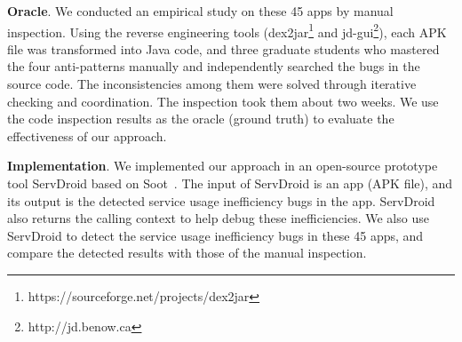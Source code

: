 \documentclass[sigconf,review, anonymous]{acmart}
\begin{document}
\textbf{Oracle}. We conducted an empirical study on these 45 apps by manual
inspection. Using the reverse engineering tools (\textsf{dex2jar}\footnote{https://sourceforge.net/projects/dex2jar} and \textsf{jd-gui}\footnote{http://jd.benow.ca}), each APK file was transformed into Java code, and three graduate students who mastered the four anti-patterns manually and independently searched the bugs in the source code. The inconsistencies among them were solved through iterative checking and coordination. The inspection took them about two weeks. We use the code inspection
results as the oracle (ground truth) to evaluate the effectiveness of our approach.

\textbf{Implementation}. We implemented our approach in an open-source prototype
tool {\sf ServDroid} based on {\sf Soot}~\cite{sootpaper}. The input of {\sf
ServDroid} is an app (APK file), and its output is the detected service usage
inefficiency bugs in the app. {\sf ServDroid} also returns the calling context to
help debug these inefficiencies. We also use {\sf ServDroid} to
detect the service usage inefficiency bugs in these 45 apps, and compare the
detected results with those of the manual inspection.
\end{document}
